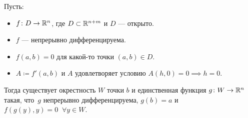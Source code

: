 \begin{theorem} 
    Пусть:
    \begin{itemize}
      \item $f \colon D \to \mathbb{R}^n$, где $D \subset \mathbb{R}^{n + m}$ и $D$ --- открыто.
      \item $f$ --- непрерывно дифференцируема.
      \item $f(a, b) = 0$ для какой-то точки $(a, b) \in D$.
      \item $A \coloneqq f'(a, b)$ и $A$ удовлетворяет условию $A(h, 0) = 0 \implies h = 0$.
    \end{itemize}
    Тогда существует окрестность $W$ точки $b$ и единственная функция $g\colon W \to \mathbb{R}^n$ такая, что~$g$ непрерывно дифференцируема, $g(b) = a$ и $f(g(y), y) = 0\;\; \forall y \in W$.
  \end{theorem}
